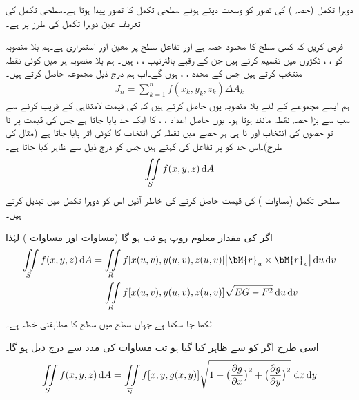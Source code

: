 دوہرا تکمل (حصہ ) کی تصور کو وسعت دیتے ہوئے سطحی تکمل کا تصور پیدا ہوتا ہے۔سطحی تکمل کی تعریف عین دوہرا تکمل کی طرز پر ہے۔

فرض کریں کہ  کسی سطح کا محدود حصہ ہے اور تفاعل  سطح  پر معین اور استمراری ہے۔ہم بلا منصوبہ  کو ، ،  ٹکڑوں میں تقسیم کرتے ہیں جن کے  رقبے بالترتیب  ، ،  ہیں۔ ہم بلا منصوبہ ہر  میں کوئی نقطہ   منتخب کرتے ہیں جس کے محدد ، ،  ہوں گے۔اب ہم درج ذیل مجموعہ حاصل کرتے ہیں۔
\begin{align}\label{مساوات_خطی_تکمل_سطحی_تکمل_الف}
J_n=\sum_{k=1}^{n}f(x_k,y_k,z_k)\Delta A_k
\end{align}
ہم ایسے مجموعے  کے لئے بلا منصوبہ یوں حاصل کرتے ہیں کہ  کی قیمت لامتناہی کے قریب کرنے سے سب سے بڑا حصہ  نقطہ مانند ہوتا ہو۔ یوں حاصل اعداد ، ،  کا ایک حد پایا جاتا ہے جس کی قیمت پر نا تو حصوں کی انتخاب اور نا ہی ہر حصے میں نقطہ کی انتخاب کا کوئی اثر پایا جاتا ہے (مثال  کی طرح)۔اس حد کو  پر تفاعل  کی  کہتے ہیں جس کو درج ذیل سے ظاہر کیا جاتا ہے۔
\begin{align}\label{مساوات_خطی_تکمل_سطحی_تکمل_ب}
\iint\limits_S f(x,y,z)\dif A
\end{align}
سطحی تکمل (مساوات ) کی قیمت حاصل کرنے کی خاطر آئیں اس کو دوہرا تکمل میں تبدیل کرتے ہیں۔

اگر  کی مقدار معلوم روپ  ہو تب  ہو گا (مساوات  اور مساوات ) لہٰذا
\begin{gather}
\begin{aligned}\label{مساوات_خطی_تکمل_سطحی_تکمل_بطور_دوہرا_الف}
\iint\limits_S f(x,y,z)\dif A&=\iint\limits_R f[x(u,v),y(u,v),z(u,v)] \abs{\bM{r}_u\times \bM{r}_v}\dif u\dif v\\
&=\iint\limits_R f[x(u,v),y(u,v),z(u,v)] \sqrt{EG-F^2}\dif u\dif v 
\end{aligned}
\end{gather}
لکھا جا سکتا ہے جہاں  سطح میں  سطح  کا مطابقتی خطہ ہے۔ 

اسی طرح اگر  کو  سے ظاہر کیا گیا ہو تب مساوات  کی مدد سے درج ذیل ہو گا۔
\begin{align}\label{مساوات_خطی_تکمل_سطحی_تکمل_بطور_دوہرا_ب}
\iint\limits_S f(x,y,z)\dif A=\iint\limits_{\overline{S}} f[x,y,g(x,y)]\sqrt{1+\big(\frac{\partial g}{\partial x}\big)^2+\big(\frac{\partial g}{\partial y}\big)^2}\,\dif x\dif y
\end{align}

